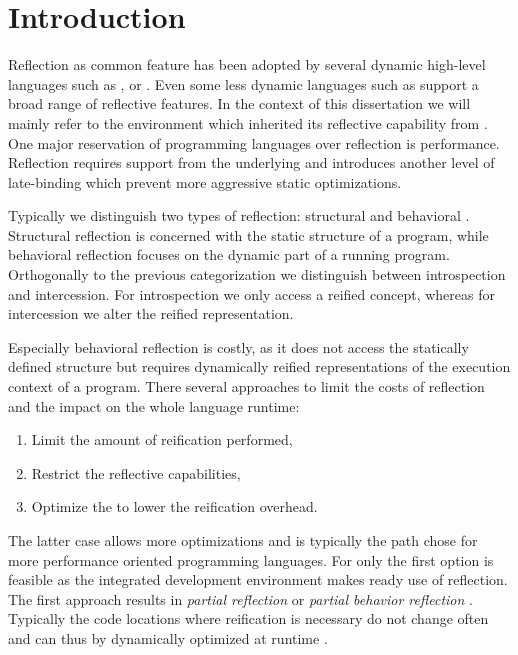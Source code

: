 
\chapter{Introduction}
\minitoc

\noindent Reflection as common feature has been adopted by several dynamic high-level languages such as ,  or .
Even some less dynamic languages such as \Java support a broad range of reflective features.
In the context of this dissertation we will mainly refer to the \PH environment which inherited its reflective capability from \ST.
One major reservation of programming languages over reflection is performance.
Reflection requires support from the underlying \VM and introduces another level of late-binding which prevent more aggressive static optimizations.

Typically we distinguish two types of reflection: structural and behavioral \cite{Maes87a}.
Structural reflection is concerned with the static structure of a program, while behavioral reflection focuses on the dynamic part of a running program.
Orthogonally to the previous categorization we distinguish between introspection and intercession. 
For introspection we only access a reified concept, whereas for intercession we alter the reified representation.

Especially behavioral reflection is costly, as it does not access the statically defined structure but requires dynamically reified representations of the execution context of a program.
There several approaches to limit the costs of reflection and the impact on the whole language runtime:
\begin{enumerate}[nolistsep]
	\item Limit the amount of reification performed,
	\item Restrict the reflective capabilities,
	\item Optimize the \VM to lower the reification overhead.
\end{enumerate}
The latter case allows more optimizations and is typically the path chose for more performance oriented programming languages.
For \PH only the first option is feasible as the integrated development environment makes ready use of reflection.
The first approach results in \emph{partial reflection} or \emph{partial behavior reflection} \cite{Tant03a}.
Typically the code locations where reification is necessary do not change often and can thus by dynamically optimized at runtime \cite{Roet07b}.

